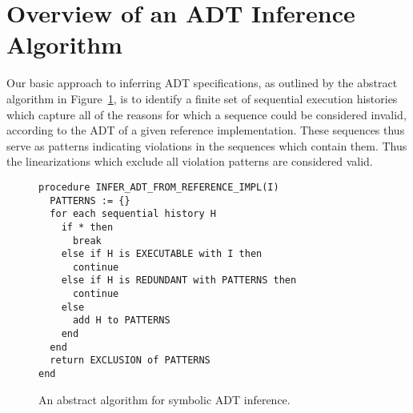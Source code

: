 \section{Overview of an ADT Inference Algorithm}
\label{sec:overview}

Our basic approach to inferring ADT specifications, as outlined by the abstract
algorithm in Figure~\ref{fig:abstract}, is to identify a finite set of
sequential execution histories which capture all of the reasons for which a
sequence could be considered invalid, according to the ADT of a given reference
implementation. These sequences thus serve as patterns indicating violations in
the sequences which contain them. Thus the linearizations which exclude all
violation patterns are considered valid.

\begin{figure}[t]
  \begin{verbatim}
procedure INFER_ADT_FROM_REFERENCE_IMPL(I)
  PATTERNS := {}
  for each sequential history H
    if * then
      break
    else if H is EXECUTABLE with I then
      continue
    else if H is REDUNDANT with PATTERNS then
      continue
    else
      add H to PATTERNS
    end
  end
  return EXCLUSION of PATTERNS
end
  \end{verbatim}
  \caption{An abstract algorithm for symbolic ADT inference.}
  \label{fig:abstract}
\end{figure}

